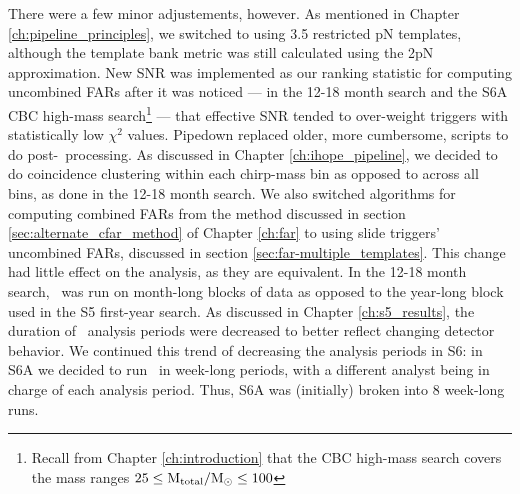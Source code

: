 There were a few minor adjustements, however. As mentioned in Chapter
\ref{ch:pipeline_principles}, we switched to using 3.5 restricted \ac{pN}
templates, although the template bank metric was still calculated using the
2\ac{pN} approximation. New \ac{SNR} was implemented as our ranking statistic
for computing uncombined \acp{FAR} after it was noticed --- in the 12-18 month
search and the S6A \ac{CBC} high-mass search\footnote{Recall from Chapter
\ref{ch:introduction} that the \ac{CBC} high-mass search covers the mass ranges
$25 \leq \mathrm{M_{total}}/\mathrm{M_\odot} \leq 100$} --- that effective \ac{SNR} tended to
over-weight triggers with statistically low $\chi^2$ values. Pipedown replaced
older, more cumbersome, scripts to do post-\hipe~processing. As discussed in
Chapter \ref{ch:ihope_pipeline}, we decided to do coincidence clustering within
each chirp-mass bin as opposed to across all bins, as done in the 12-18 month
search. We also switched algorithms for computing combined \acp{FAR} from the
method discussed in section \ref{sec:alternate_cfar_method} of Chapter
\ref{ch:far} to using slide triggers' uncombined \acp{FAR}, discussed in
section \ref{sec:far-multiple_templates}. This change had little effect on the
analysis, as they are equivalent. In the 12-18 month search, \ihope~was run on
month-long blocks of data as opposed to the year-long block used in the \ac{S5}
first-year search. As discussed in Chapter \ref{ch:s5_results}, the duration of
\ihope~analysis periods were decreased to better reflect changing detector
behavior. We continued this trend of decreasing the analysis periods in
\ac{S6}: in S6A we decided to run \ihope~in week-long periods, with a different
analyst being in charge of each analysis period. Thus, S6A was (initially)
broken into 8 week-long runs.

